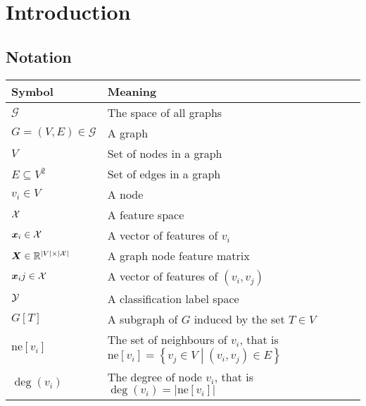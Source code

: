 \chapter{Introduction}

\section{Notation}

\begin{tabular}{ll}
	\toprule
	\textbf{Symbol} & \textbf{Meaning} \\
	\midrule
	\( \mathcal{G} \) & The space of all graphs \\
	\( G = \left( V, E \right) \in \mathcal{G} \) & A graph \\
	\( V \) & Set of nodes in a graph \\
	\( E \subseteq V^2 \) & Set of edges in a graph \\
	\( v_i \in V \) & A node \\
	\( \mathcal{X} \) & A feature space \\
	\( \bm{x}_i \in \mathcal{X} \) & A vector of features of \( v_i \) \\
	\( \bm{X} \in \mathbb{R}^{\left\lvert V \right\rvert \times \left\lvert \mathcal{X} \right\rvert} \) & A graph node feature matrix	\\
	\( \bm{x}_ij \in \mathcal{X} \) & A vector of features of \( \left( v_i, v_j \right) \) \\
	\( \mathcal{Y} \) & A classification label space \\
	\( G \left[ T \right] \) & A subgraph of \( G \) induced by the set \( T \in V \) \\
	\( \mathrm{ne}[v_i] \) & The set of neighbours of \( v_i \), that is \( \mathrm{ne}[v_i] = \left\{ v_j \in V \middle| \left( v_i, v_j \right) \in E \right\} \) \\
	\( \deg \left( v_i \right) \) & The degree of node \( v_i \), that is \( \deg \left( v_i \right) = \left\lvert \mathrm{ne}[v_i] \right\rvert \) \\
	\bottomrule
\end{tabular}
